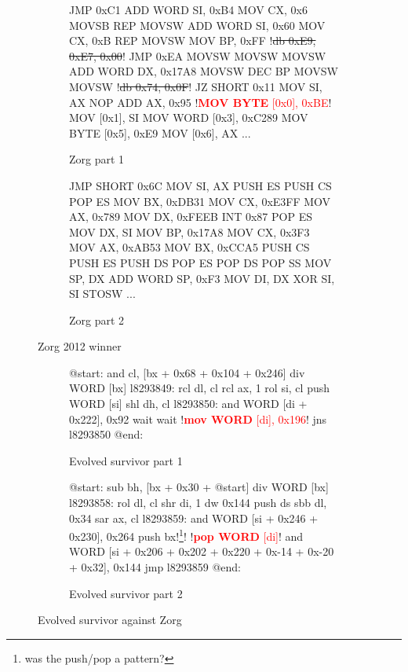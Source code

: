\documentclass[dvipsnames,format=sigconf,anonymous=true,review=true]{acmart}
\begin{document}
\begin{figure}
\centering
\begin{subfigure}{0.48\textwidth}
    \begin{assembly}
    JMP 0xC1
    ADD WORD SI, 0xB4
    MOV CX, 0x6
    MOVSB
    REP MOVSW
    ADD WORD SI, 0x60
    MOV CX, 0xB
    REP MOVSW
    MOV BP, 0xFF
    !\sout{db 0xE9, 0xE7, 0x00}! JMP 0xEA
    MOVSW
    MOVSW
    MOVSW
    ADD WORD DX, 0x17A8
    MOVSW
    DEC BP
    MOVSW
    MOVSW
    !\sout{db 0x74, 0x0F}! JZ SHORT 0x11
    MOV SI, AX
    NOP
    ADD AX, 0x95
    !\textcolor{red}{\textbf{MOV BYTE} [0x0], 0xBE}!
    MOV [0x1], SI
    MOV WORD [0x3], 0xC289
    MOV BYTE [0x5], 0xE9
    MOV [0x6], AX
    ...
    \end{assembly}
    \caption{Zorg part 1}
\end{subfigure}
\hfill
\begin{subfigure}{0.49\textwidth}
    \begin{assembly}
    JMP SHORT 0x6C
    MOV SI, AX
    PUSH ES
    PUSH CS
    POP ES
    MOV BX, 0xDB31
    MOV CX, 0xE3FF
    MOV AX, 0x789
    MOV DX, 0xFEEB
    INT 0x87
    POP ES
    MOV DX, SI
    MOV BP, 0x17A8
    MOV CX, 0x3F3
    MOV AX, 0xAB53
    MOV BX, 0xCCA5
    PUSH CS
    PUSH ES
    PUSH DS
    POP ES
    POP DS
    POP SS
    MOV SP, DX
    ADD WORD SP, 0xF3
    MOV DI, DX
    XOR SI, SI
    STOSW 
    ...
    \end{assembly}
    \caption{Zorg part 2}
\end{subfigure}
\caption{Zorg 2012 winner}
\label{oroginal_zorg}
\end{figure}

\begin{figure}
\centering
\begin{subfigure}[t]{0.48\textwidth}
    \begin{assembly}
    @start:
    and cl, [bx + 0x68 + 0x104 + 0x246]
    div WORD [bx]
    l8293849:
    rcl dl, cl
    rcl ax, 1
    rol si, cl
    push WORD [si]
    shl dh, cl
    l8293850:
    and WORD [di + 0x222], 0x92
    wait
    wait
    !\textcolor{red}{\textbf{mov WORD} [di], 0x196}!
    jns l8293850
    @end:
    \end{assembly}
    \caption{Evolved survivor part 1}
\end{subfigure}
\hfill
\begin{subfigure}[t]{0.49\textwidth}
    \begin{assembly}
    @start:
    sub bh, [bx + 0x30 + @start]
    div WORD [bx]
    l8293858:
    rol dl, cl
    shr di, 1
    dw 0x144
    push ds
    sbb dl, 0x34
    sar ax, cl
    l8293859:
    and WORD [si + 0x246 + 0x230], 0x264
    push bx!\footnote{was the push/pop a pattern?}!
    !\textcolor{red}{\textbf{pop WORD} [di]}!
    and WORD [si + 0x206 + 0x202 + 0x220 + 0x-14 + 0x-20 + 0x32], 0x144
    jmp l8293859
    @end:
    \end{assembly}
    \caption{Evolved survivor part 2}
\end{subfigure}
\caption{Evolved survivor against Zorg}
\label{evolved_zorg}
\end{figure}
\end{document}
